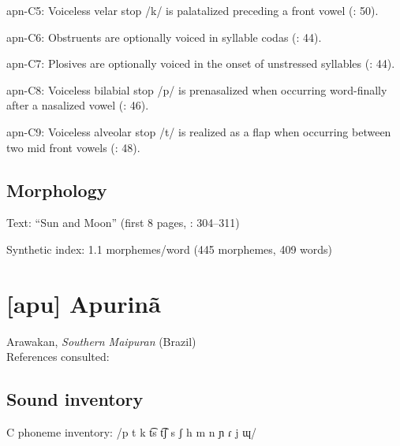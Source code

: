 {\begin{appendixdesc}
\item[apn-C5:] Voiceless velar stop /k/ is palatalized preceding a front vowel (\citealt{CunhadeOliveira2005}: 50).

\item[apn-C6:] Obstruents are optionally voiced in syllable codas (\citealt{CunhadeOliveira2005}: 44).

\item[apn-C7:] Plosives are optionally voiced in the onset of unstressed syllables (\citealt{CunhadeOliveira2005}: 44).

\item[apn-C8:] Voiceless bilabial stop /p/ is prenasalized when occurring word-finally after a nasalized vowel (\citealt{CunhadeOliveira2005}: 46).

\item[apn-C9:] Voiceless alveolar stop /t/ is realized as a flap when occurring between two mid front vowels (\citealt{CunhadeOliveira2005}: 48).
\end{appendixdesc}
\subsection*{Morphology}

\begin{appendixdesc}

\item[Text:] “Sun and Moon” (first 8 pages, \citealt{CunhadeOliveira2005}: 304--311)

\item[Synthetic index:] 1.1 morphemes/word (445 morphemes, 409 words)
\end{appendixdesc}

\section*{[apu] Apurinã}   %
Arawakan, \textit{Southern Maipuran} (Brazil)\medskip\\
References consulted: \citet{Facundes2000}

\subsection*{Sound inventory}
\begin{appendixdesc}

\item[C phoneme inventory:] /p t k t͡s t͡ʃ s ʃ h m n ɲ ɾ j ɰ/


\end{appendixdesc}}
